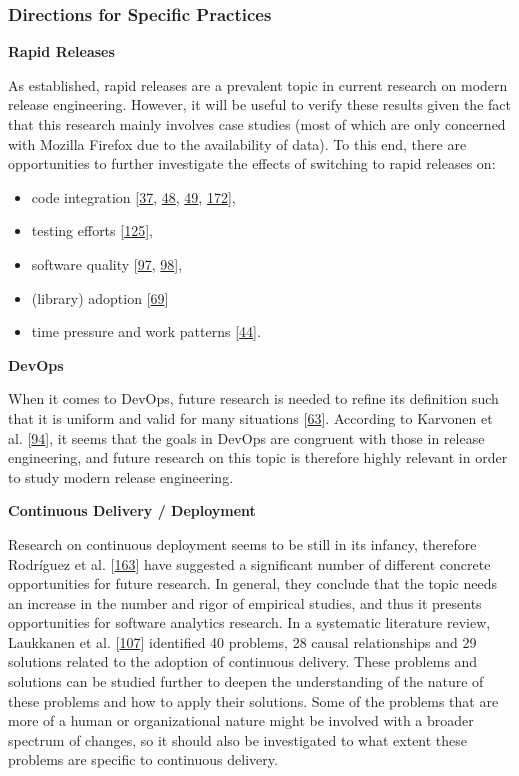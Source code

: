 \documentclass[]{book}
\providecommand{\tightlist}{%
  \setlength{\itemsep}{0pt}\setlength{\parskip}{0pt}}
\begin{document}
\subsubsection{Directions for Specific
Practices}\label{directions-for-specific-practices}

\textbf{Rapid Releases}

As established, rapid releases are a prevalent topic in current research
on modern release engineering. However, it will be useful to verify
these results given the fact that this research mainly involves case
studies (most of which are only concerned with Mozilla Firefox due to
the availability of data). To this end, there are opportunities to
further investigate the effects of switching to rapid releases on:

\begin{itemize}
\tightlist
\item
  code integration {[}\protect\hyperlink{ref-castelluccio2017a}{37},
  \protect\hyperlink{ref-da2014a}{48},
  \protect\hyperlink{ref-da2016a}{49},
  \protect\hyperlink{ref-souza2015a}{172}{]},
\item
  testing efforts {[}\protect\hyperlink{ref-mantyla2015a}{125}{]},
\item
  software quality {[}\protect\hyperlink{ref-khomh2015a}{97},
  \protect\hyperlink{ref-khomh2012a}{98}{]},
\item
  (library) adoption {[}\protect\hyperlink{ref-fujibayashi2017a}{69}{]}
\item
  time pressure and work patterns
  {[}\protect\hyperlink{ref-claes2017a}{44}{]}.
\end{itemize}

\textbf{DevOps}

When it comes to DevOps, future research is needed to refine its
definition such that it is uniform and valid for many situations
{[}\protect\hyperlink{ref-dyck2015a}{63}{]}. According to Karvonen et
al. {[}\protect\hyperlink{ref-karvonen2017a}{94}{]}, it seems that the
goals in DevOps are congruent with those in release engineering, and
future research on this topic is therefore highly relevant in order to
study modern release engineering.

\textbf{Continuous Delivery / Deployment}

Research on continuous deployment seems to be still in its infancy,
therefore Rodríguez et al.
{[}\protect\hyperlink{ref-rodriguez2017a}{163}{]} have suggested a
significant number of different concrete opportunities for future
research. In general, they conclude that the topic needs an increase in
the number and rigor of empirical studies, and thus it presents
opportunities for software analytics research. In a systematic
literature review, Laukkanen et al.
{[}\protect\hyperlink{ref-laukkanen2017a}{107}{]} identified 40
problems, 28 causal relationships and 29 solutions related to the
adoption of continuous delivery. These problems and solutions can be
studied further to deepen the understanding of the nature of these
problems and how to apply their solutions. Some of the problems that are
more of a human or organizational nature might be involved with a
broader spectrum of changes, so it should also be investigated to what
extent these problems are specific to continuous delivery.
\end{document}
